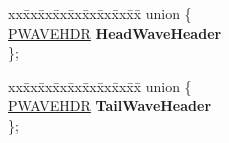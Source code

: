 \begin{DoxyCompactItemize}
\begin{tabbing}
\end{tabbing}\item 
\mbox{\label{struct___s_o_u_n_d___d_e_v_i_c_e___i_n_s_t_a_n_c_e_a89d00a63d6dee3533cf694bbe4a2cbb1}} 
\begin{tabbing}
xx\=xx\=xx\=xx\=xx\=xx\=xx\=xx\=xx\=\kill
union \{\\
\>\hyperlink{structwavehdr__tag}{PWAVEHDR} {\bfseries HeadWaveHeader}\\
\}; \\

\end{tabbing}\item 
\mbox{\label{struct___s_o_u_n_d___d_e_v_i_c_e___i_n_s_t_a_n_c_e_a2518eaee51c81a46096b9774384e12c6}} 
\begin{tabbing}
xx\=xx\=xx\=xx\=xx\=xx\=xx\=xx\=xx\=\kill
union \{\\
\>\hyperlink{structwavehdr__tag}{PWAVEHDR} {\bfseries TailWaveHeader}\\
\}; \\


\end{tabbing}
\end{DoxyCompactItemize}
